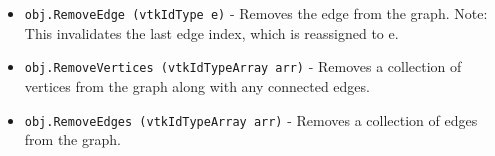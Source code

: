 \begin{itemize}
\item  \verb|obj.RemoveEdge (vtkIdType e)| -  Removes the edge from the graph.
 Note: This invalidates the last edge index, which is reassigned to e.

\item  \verb|obj.RemoveVertices (vtkIdTypeArray arr)| -  Removes a collection of vertices from the graph along with any connected edges.

\item  \verb|obj.RemoveEdges (vtkIdTypeArray arr)| -  Removes a collection of edges from the graph.

\end{itemize}
